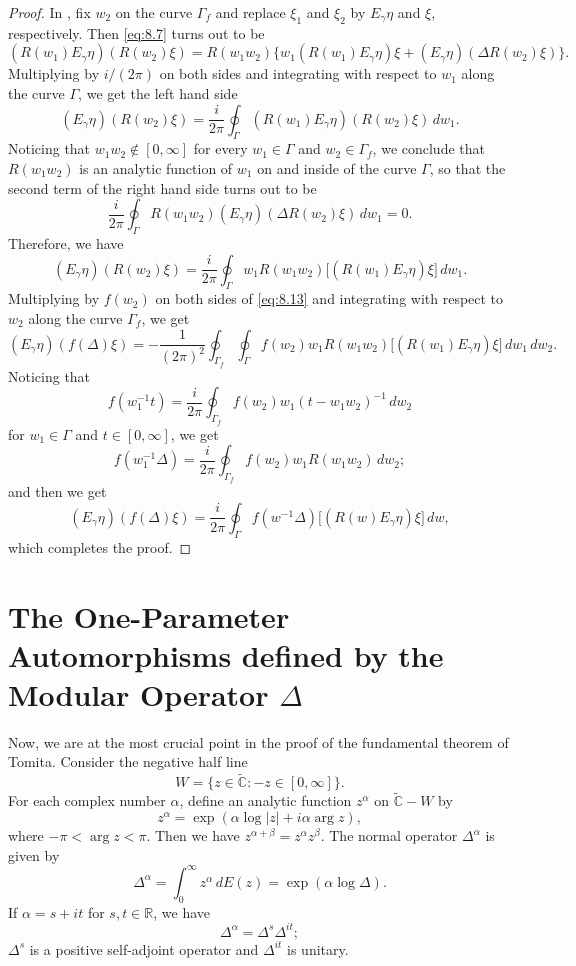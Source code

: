 \documentclass[12pt,b5paper,twoside]{article}
\theoremstyle{takesaki}
\numberwithin{equation}{section}
\begin{document}
\begin{proof}
In , fix $w_2$ on the curve $\Gamma_f$ and replace
$\xi_1$ and
$\xi_2$ by $E_\gamma\eta$ and $\xi$, respectively.  Then
\eqref{eq:8.7} turns out to be
\[
 (R(w_1)E_\gamma\eta)(R(w_2)\xi)
 =R(w_1w_2)\{w_1(R(w_1)E_\gamma\eta)\xi
 +(E_\gamma\eta)(\Delta R(w_2)\xi)\}.
\]
Multiplying by $i/(2\pi)$ on both sides and integrating with respect
to $w_1$ along the curve $\Gamma$, we get the left hand side
\[
 (E_\gamma\eta)(R(w_2)\xi)
 =\frac{i}{2\pi}\oint_\Gamma
 (R(w_1)E_\gamma\eta)(R(w_2)\xi)\,dw_1.
\]
Noticing that $w_1w_2\notin[0,\infty]$ for every $w_1\in\Gamma$ and
$w_2\in\Gamma_f$, we conclude that $R(w_1w_2)$ is an analytic
function of $w_1$ on and inside of the curve $\Gamma$, so that the
second term of the right hand side turns out to be
\[
 \frac{i}{2\pi}\oint_\Gamma
 R(w_1w_2)(E_\gamma\eta)(\Delta R(w_2)\xi)\,dw_1=0.
\]
Therefore, we have
\begin{equation}
 (E_\gamma\eta)(R(w_2)\xi)
 =\frac{i}{2\pi}\oint_\Gamma
 w_1R(w_1w_2)\bigl[(R(w_1)E_\gamma\eta)\xi\bigr] \,dw_1.
 \tag{8.13}\label{eq:8.13}
\end{equation}
Multiplying by $f(w_2)$ on both sides of \eqref{eq:8.13} and
integrating with respect to $w_2$ along the curve $\Gamma_f$, we get
\[
 (E_\gamma\eta)(f(\Delta)\xi)
 =-\frac{1}{(2\pi)^2}\oint_{\Gamma_f}\oint_\Gamma
 f(w_2)w_1R(w_1w_2)
 \bigl[(R(w_1)E_\gamma\eta)\xi\bigr] \,dw_1\,dw_2.
\]
Noticing that
\[
 f(w_1^{-1}t)=\frac{i}{2\pi}\oint_{\Gamma_f}
 f(w_2)w_1(t-w_1w_2)^{-1}\,dw_2
\]
for $w_1\in\Gamma$ and $t\in[0,\infty]$, we get
\[
 f(w_1^{-1}\Delta)=\frac{i}{2\pi}\oint_{\Gamma_f}
 f(w_2)w_1R(w_1w_2)\,dw_2;
\]
and then we get
\[
 (E_\gamma\eta)(f(\Delta)\xi)
 =\frac{i}{2\pi}\oint_\Gamma
 f(w^{-1}\Delta)\bigl[(R(w)E_\gamma\eta)\xi\bigr] \,dw,
\]
which completes the proof.
\end{proof}

\section{The One-Parameter Automorphisms defined by the Modular Operator
\texorpdfstring{$\Delta$}{Delta}}\label{sec:9}

Now, we are at the most crucial point in the proof of the fundamental
theorem of Tomita.  Consider the negative half line
\[
 W=\{z\in\widetilde{\mathbb C}:-z\in[0,\infty]\}.
\]
For each complex number $\alpha$, define an analytic function $z^\alpha$
on $\widetilde{\mathbb C}-W$ by
\[
 z^\alpha=\exp(\alpha\log|z|+i\alpha\arg z),
\]
where $-\pi<\arg z<\pi$.  Then we have
$z^{\alpha+\beta}=z^\alpha z^\beta$.  The normal operator
$\Delta^\alpha$ is given by
\begin{equation}
 \Delta^\alpha=\int_0^\infty z^\alpha\,dE(z)
 =\exp(\alpha\log\Delta).
 \tag{9.1}\label{eq:9.1}
\end{equation}
If $\alpha=s+it$ for $s,t\in\mathbb R$, we have
\[
  \Delta^\alpha=\Delta^s\Delta^{it};
\]
$\Delta^s$ is a positive self-adjoint operator and $\Delta^{it}$ is
unitary.
\end{document}

